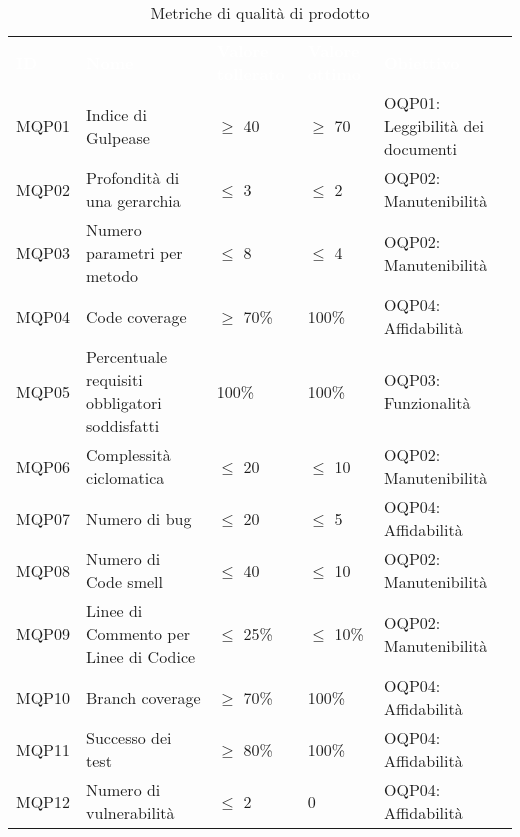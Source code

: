\begin{table}[H]
    \renewcommand{\arraystretch}{1.5}
    \begin{tabular}{ m{}<{\centering}  m{}<{\centering}  m{}<{\centering}  m{}<{\centering} m{}<{\centering}}
        \rowcolor{darkblue}
        \textcolor{white}{\textbf{ID}} &\textcolor{white}{\textbf{Nome}}& \textcolor{white}{\textbf{Valore tollerato}} & \textcolor{white}{\textbf{Valore ottimo}} & \textcolor{white}{\textbf{Obiettivo}}\\ 
        MQP01 &
        Indice di Gulpease  &
        $\geq$ 40 &
        $\geq$ 70  &
        OQP01: Leggibilità dei documenti \\


        MQP02 &
        Profondità di una gerarchia &
        $\leq$ 3 &
        $\leq$ 2 &
        OQP02: Manutenibilità \\

        MQP03 &
        Numero parametri per metodo &
        $\leq$ 8 &
        $\leq$ 4 &
        OQP02: Manutenibilità \\


        MQP04 &
        Code coverage &
        $\geq$ 70\% &
        100\% &
        OQP04: Affidabilità \\

        MQP05 &
        Percentuale requisiti obbligatori soddisfatti &
        100\% &
        100\% &
        OQP03: Funzionalità \\


        MQP06 &
        Complessità ciclomatica &
        $\leq$ 20 &
        $\leq$ 10 &
        OQP02: Manutenibilità \\

        MQP07 &
        Numero di bug &
        $\leq$ 20 &
        $\leq$ 5 &
        OQP04: Affidabilità \\


        MQP08 &
        Numero di Code smell &
        $\leq$ 40 &
        $\leq$ 10 &
        OQP02: Manutenibilità \\

        MQP09 &
        Linee di Commento per Linee di Codice  &
        $\leq$ 25\% &
        $\leq$ 10\% &
        OQP02: Manutenibilità \\


        MQP10 &
        Branch coverage &
        $\geq$ 70\% &
        100\% &
        OQP04: Affidabilità \\

        MQP11 &
        Successo dei test &
        $\geq$ 80\% &
        100\% &
        OQP04: Affidabilità \\


        MQP12 &
        Numero di vulnerabilità &
        $\leq$ 2 &
        0 &
        OQP04: Affidabilità \\
    \end{tabular}
    \caption{Metriche di qualità di prodotto}
\end{table}
